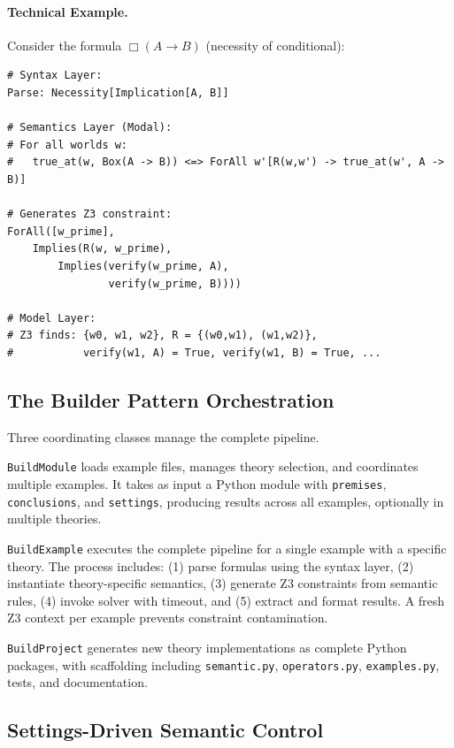 \documentclass[pdflatex,sn-mathphys-num]{sn-jnl}
\newcommand{\nec}{\Box}                     %
\newcommand{\imp}{\to}                      %
\theoremstyle{thmstyleone}
\theoremstyle{thmstyletwo}
\theoremstyle{thmstylethree}
\begin{document}
\paragraph{Technical Example.}
Consider the formula $\nec(A \imp B)$ (necessity of conditional):

\begin{lstlisting}[caption={From formula to constraint}]
# Syntax Layer:
Parse: Necessity[Implication[A, B]]

# Semantics Layer (Modal):
# For all worlds w:
#   true_at(w, Box(A -> B)) <=> ForAll w'[R(w,w') -> true_at(w', A -> B)]

# Generates Z3 constraint:
ForAll([w_prime],
    Implies(R(w, w_prime),
        Implies(verify(w_prime, A),
                verify(w_prime, B))))

# Model Layer:
# Z3 finds: {w0, w1, w2}, R = {(w0,w1), (w1,w2)},
#           verify(w1, A) = True, verify(w1, B) = True, ...
\end{lstlisting}

\subsection{The Builder Pattern Orchestration}\label{sec:builder}

Three coordinating classes manage the complete pipeline.

\texttt{BuildModule} loads example files, manages theory selection, and coordinates multiple examples.
It takes as input a Python module with \texttt{premises}, \texttt{conclusions}, and \texttt{settings}, producing results across all examples, optionally in multiple theories.

\texttt{BuildExample} executes the complete pipeline for a single example with a specific theory.
The process includes: (1) parse formulas using the syntax layer, (2) instantiate theory-specific semantics, (3) generate Z3 constraints from semantic rules, (4) invoke solver with timeout, and (5) extract and format results.
A fresh Z3 context per example prevents constraint contamination.

\texttt{BuildProject} generates new theory implementations as complete Python packages, with scaffolding including \texttt{semantic.py}, \texttt{operators.py}, \texttt{examples.py}, tests, and documentation.

\subsection{Settings-Driven Semantic Control}\label{sec:settings}
\end{document}
